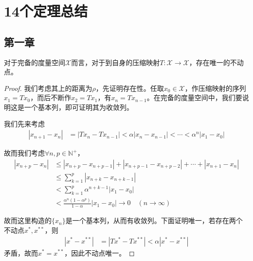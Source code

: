 \chapter{14个定理总结}
\section{第一章}
\begin{theorem}[Banach压缩映像原理]
    对于完备的度量空间$\mathscr{X}$而言，对于到自身的压缩映射$T:\mathscr{X}\to\mathscr{X}$，存在唯一的不动点。
\end{theorem}
\begin{proof}
    我们考虑其上的距离为$\rho$，先证明存在性。任取$x_0\in\mathscr{X}$，作压缩映射的序列$x_1 = Tx_0$，而后不断作$x_2 = Tx_1$，有$x_n = Tx_{n-1}$。在完备的度量空间中，我们要说明这是一个基本列，即可证明其为收敛列。

    我们先来考虑
    \begin{align*}
        |x_{n+1} - x_{n}| &= |Tx_{n} - Tx_{n-1}| < \alpha |x_{n} - x_{n-1}| < \cdots < \alpha^{n} |x_1 - x_0| 
    \end{align*}

    故而我们考虑$\forall n,p\in\mathbb{N}^+$，
    \begin{align*}
        |x_{n+p} - x_n| &\leqslant |x_{n+p} - x_{n+p-1}| + |x_{n+p-1} - x_{n+p-2}| + \cdots + |x_{n+1} - x_n| \\
        & \leqslant \sum\limits_{k=1}^{p} |x_{n+k} - x_{n+k-1}| \\
        & < \sum\limits_{k=1}^{p} \alpha^{n+k-1} |x_{1} - x_{0}| \\
        & < \frac{\alpha^n(1-\alpha^p)}{1-\alpha} |x_1 - x_0| \to 0\quad (n\to\infty)
    \end{align*}

    故而这里构造的$\{x_n\}$是一个基本列，从而有收敛列。下面证明唯一，若存在两个不动点$x^*,x^{**}$，则
    \begin{align*}
        |x^* - x^{**}| & = |Tx^* - Tx^{**}| < \alpha |x^* - x^{**}|
    \end{align*}
    矛盾，故而$x^* = x^{**}$，因此不动点唯一。
\end{proof}

